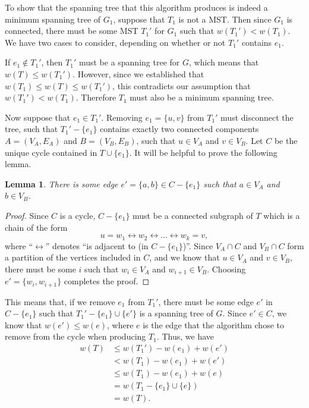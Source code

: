 \documentclass[10pt]{article}
\newtheorem{lemma}{Lemma}
\begin{document}
To show that the spanning tree that this algorithm produces is indeed a minimum spanning tree of \(G_1\), suppose that \(T_1\) is not a MST. Then since \(G_1\) is connected, there must be some MST \(T_1'\) for \(G_1\) such that \(w(T_1') < w(T_1)\). We have two cases to consider, depending on whether or not \(T_1'\) contains \(e_1\).

If \(e_1 \notin T_1'\), then \(T_1'\) must be a spanning tree for \(G\), which means that \(w(T) \leq w(T_1')\). However, since we established that \(w(T_1) \leq w(T) \leq w(T_1')\), this contradicts our assumption that \(w(T_1') < w(T_1)\). Therefore \(T_1\) must also be a minimum spanning tree.

Now suppose that \(e_1 \in T_1'\). Removing \(e_1 = \{u, v\}\) from \(T_1'\) must disconnect the tree, such that \(T_1' - \{e_1\}\) contains exactly two connected components \(A = (V_A, E_A)\) and \(B = (V_B, E_B)\), such that \(u \in V_A\) and \(v \in V_B\). Let \(C\) be the unique cycle contained in \(T \cup \{e_1\}\). It will be helpful to prove the following lemma.

\begin{lemma}There is some edge \(e' = \{a, b\} \in C - \{e_1\}\) such that \(a \in V_A\) and \(b \in V_B\).\end{lemma}
\begin{proof}
Since \(C\) is a cycle, \(C - \{e_1\}\) must be a connected subgraph of \(T\) which is a chain of the form \[u = w_1 \longleftrightarrow w_2 \longleftrightarrow \dots \longleftrightarrow w_k = v, \] where ``\(\longleftrightarrow\)'' denotes ``is adjacent to (in \(C - \{e_1\}\))''. Since \(V_A \cap C\) and \(V_B \cap C\) form a partition of the vertices included in \(C\), and we know that \(u \in V_A\) and \(v \in V_B\), there must be some \(i\) such that \(w_i \in V_A\) and \(w_{i+1} \in V_B\). Choosing \(e' = \{w_i, w_{i+1}\}\) completes the proof.
\end{proof}

This means that, if we remove \(e_1\) from \(T_1'\), there must be some edge \(e'\) in \(C - \{e_1\}\) such that \(T_1' - \{e_1\} \cup \{e'\}\) is a spanning tree of \(G\). Since \(e' \in C\), we know that \(w(e') \leq w(e)\), where \(e\) is the edge that the algorithm chose to remove from the cycle when producing \(T_1\). Thus, we have \begin{align*}
w(T) &\leq w(T_1') - w(e_1) + w(e') \\
&< w(T_1) - w(e_1) + w(e') \\
&\leq w(T_1) - w(e_1) + w(e) \\
&= w(T_1 - \{e_1\} \cup \{e\}) \\
&= w(T).
\end{align*}
\end{document}
